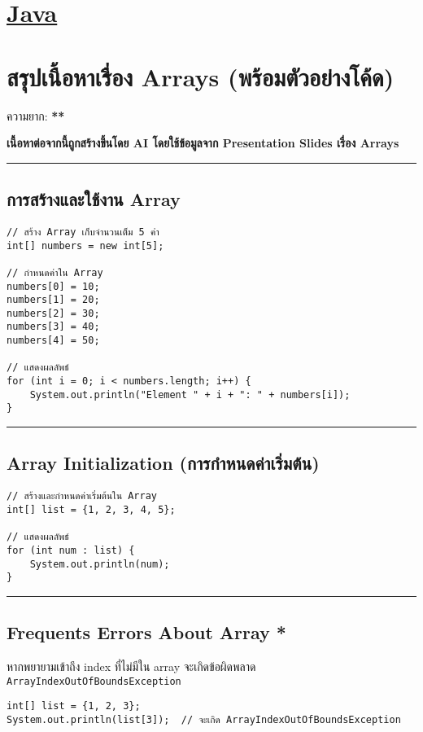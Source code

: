 \documentclass[11pt]{article}
\date{\today}
\title{}
\begin{document}
\tableofcontents

\section{\href{./index.org}{\textbf{Java}}}
\label{sec:org1322d8f}
\section{สรุปเนื้อหาเรื่อง Arrays (พร้อมตัวอย่างโค้ด)}
\label{sec:org4c7f192}
ความยาก: \textbf{**}

\textbf{เนื้อหาต่อจากนี้ถูกสร้างขึ้นโดย AI โดยใช้ข้อมูลจาก Presentation Slides เรื่อง Arrays}

\noindent\rule{\textwidth}{0.5pt}
\subsection{การสร้างและใช้งาน Array}
\label{sec:org2682746}
\begin{verbatim}
// สร้าง Array เก็บจำนวนเต็ม 5 ค่า
int[] numbers = new int[5];

// กำหนดค่าใน Array
numbers[0] = 10;
numbers[1] = 20;
numbers[2] = 30;
numbers[3] = 40;
numbers[4] = 50;

// แสดงผลลัพธ์
for (int i = 0; i < numbers.length; i++) {
    System.out.println("Element " + i + ": " + numbers[i]);
}
\end{verbatim}

\noindent\rule{\textwidth}{0.5pt}
\subsection{Array Initialization (การกำหนดค่าเริ่มต้น)}
\label{sec:org6b70f35}
\begin{verbatim}
// สร้างและกำหนดค่าเริ่มต้นใน Array
int[] list = {1, 2, 3, 4, 5};

// แสดงผลลัพธ์
for (int num : list) {
    System.out.println(num);
}
\end{verbatim}

\noindent\rule{\textwidth}{0.5pt}
\subsection{Frequents Errors About Array \textbf{*}}
\label{sec:orgcbc250f}
หากพยายามเข้าถึง index ที่ไม่มีใน array จะเกิดข้อผิดพลาด
\texttt{ArrayIndexOutOfBoundsException}

\begin{verbatim}
int[] list = {1, 2, 3};
System.out.println(list[3]);  // จะเกิด ArrayIndexOutOfBoundsException
\end{verbatim}
\end{document}
